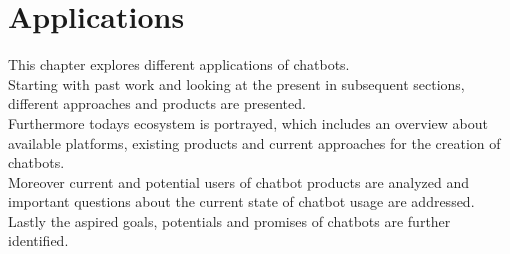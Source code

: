 \chapter{Applications}


This chapter explores different applications of chatbots.
\\
Starting with past work and looking at the present in subsequent sections,
different approaches and products are presented.
\\
Furthermore todays ecosystem is portrayed,
which includes an overview about available platforms,
existing products
and current approaches for the creation of chatbots.
\\
Moreover current and potential users of chatbot products are analyzed
and important questions about the current state of chatbot usage are addressed.
\\
Lastly the aspired goals, potentials and promises of chatbots are further identified.
